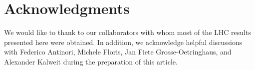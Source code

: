 \section*{Acknowledgments}

We would like to thank to our collaborators with whom most of the LHC results presented here were obtained. In addition, we acknowledge helpful discussions with Federico Antinori, Michele Floris, Jan Fiete Grosse-Oetringhaus, and Alexander Kalweit during the preparation of this article.